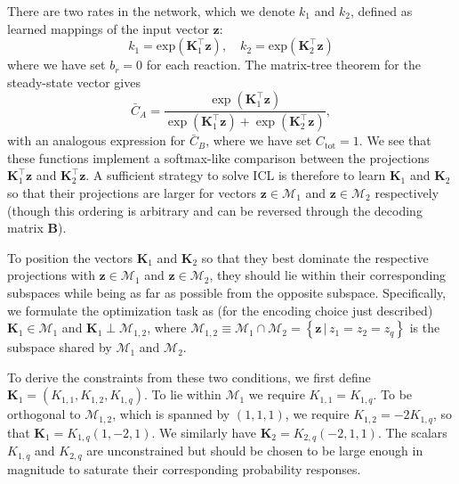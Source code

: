 \documentclass[%
reprint,
superscriptaddress,
amsmath,amssymb,
aps,
]{revtex4-2}
\begin{document}
\begin{onecolumngrid}
		There are two rates in the network, which we denote $k_1$ and $k_2$, defined as learned mappings of the input vector $\mathbf{z}$:
		\begin{equation}
			k_1 = \text{exp}(\mathbf{K}_1^\intercal \mathbf{z}), \quad k_2 = \text{exp}(\mathbf{K}_2^\intercal \mathbf{z})
		\end{equation}
		where we have set $b_r = 0$ for each reaction.  
		The matrix-tree theorem \cite{schnakenberg1976network} for the steady-state vector gives
		\begin{equation}
			\bar{C}_A = \frac{\exp\left(\mathbf{K}_1^\intercal \mathbf{z}\right)}{\exp\left(\mathbf{K}_1^\intercal \mathbf{z}\right) + \exp\left(\mathbf{K}_2^\intercal \mathbf{z}\right)},
		\end{equation}
		with an analogous expression for $\bar{C}_B$, where we have set $C_\text{tot} = 1$.  We see that these functions implement a softmax-like comparison between the projections $\mathbf{K}_1^\intercal \mathbf{z}$ and $\mathbf{K}_2^\intercal \mathbf{z}$.  A sufficient strategy to solve ICL is therefore to learn $\mathbf{K}_1$ and $\mathbf{K}_2$ so that their projections are larger for vectors $\mathbf{z} \in \mathcal{M}_1$ and $\mathbf{z} \in \mathcal{M}_2$ respectively (though this ordering is arbitrary and can be reversed through the decoding matrix $\mathbf{B}$).
		
		To position the vectors $\mathbf{K}_1$ and $\mathbf{K}_2$ so that they best dominate the respective projections with $\mathbf{z} \in \mathcal{M}_1$ and $\mathbf{z} \in \mathcal{M}_2$, they should lie within their corresponding subspaces while being as far as possible from the opposite subspace.  Specifically, we formulate the optimization task as (for the encoding choice just described) $\mathbf{K}_1 \in \mathcal{M}_1$ and $\mathbf{K}_1 \perp \mathcal{M}_{1,2}$, where $\mathcal{M}_{1,2}  \equiv \mathcal{M}_1 \cap \mathcal{M}_2 = \left\{\mathbf{z} \,\big|\, z_1 = z_2 = z_q\right\}$ is the subspace shared by $\mathcal{M}_1$ and $\mathcal{M}_2$.  
		
		To derive the constraints from these two conditions, we first define $\mathbf{K}_1 = (K_{1,1}, K_{1,2}, K_{1,q})$.  To lie within $\mathcal{M}_1$ we require $K_{1,1} = K_{1,q}$.  To be orthogonal to $\mathcal{M}_{1,2}$, which is spanned by $(1,1,1)$, we require $K_{1,2} = -2 K_{1,q}$, so that $\mathbf{K}_1 = K_{1,q}(1,-2,1)$.  We similarly have $\mathbf{K}_2 = K_{2,q}(-2,1,1)$.  The scalars $K_{1,q}$ and $K_{2,q}$ are unconstrained but should be chosen to be large enough in magnitude to saturate their corresponding probability responses.  
		

\end{onecolumngrid}
\end{document}
